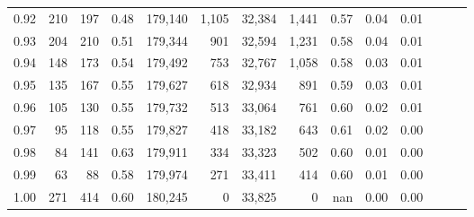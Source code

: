 \begin{tabular}{rrrrrrrrrrrrrr}
0.92 &    210 &  197 &  0.48 &  179,140 &    1,105 &  32,384 &   1,441 &  0.57 &  0.04 &      0.01 \\
0.93 &    204 &  210 &  0.51 &  179,344 &      901 &  32,594 &   1,231 &  0.58 &  0.04 &      0.01 \\
0.94 &    148 &  173 &  0.54 &  179,492 &      753 &  32,767 &   1,058 &  0.58 &  0.03 &      0.01 \\
0.95 &    135 &  167 &  0.55 &  179,627 &      618 &  32,934 &     891 &  0.59 &  0.03 &      0.01 \\
0.96 &    105 &  130 &  0.55 &  179,732 &      513 &  33,064 &     761 &  0.60 &  0.02 &      0.01 \\
0.97 &     95 &  118 &  0.55 &  179,827 &      418 &  33,182 &     643 &  0.61 &  0.02 &      0.00 \\
0.98 &     84 &  141 &  0.63 &  179,911 &      334 &  33,323 &     502 &  0.60 &  0.01 &      0.00 \\
0.99 &     63 &   88 &  0.58 &  179,974 &      271 &  33,411 &     414 &  0.60 &  0.01 &      0.00 \\
1.00 &    271 &  414 &  0.60 &  180,245 &        0 &  33,825 &       0 &   nan &  0.00 &      0.00 \\
\bottomrule
\end{tabular}
